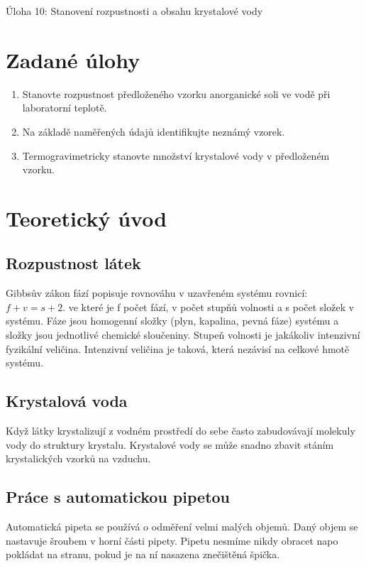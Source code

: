 \documentclass[13pt, a4paper, twoside]{article}
\begin{document}
\begin{center}
    \Huge
    Úloha 10: Stanovení rozpustnosti a obsahu krystalové vody
\end{center}
\large \onehalfspacing
\section*{Zadané úlohy}
\begin{enumerate}
    \item Stanovte rozpustnost předloženého vzorku anorganické soli ve vodě při laboratorní teplotě.
    \item Na základě naměřených údajů identifikujte neznámý vzorek.
    \item Termogravimetricky stanovte množství krystalové vody v předloženém vzorku.
\end{enumerate}

\section*{Teoretický úvod}
\subsection*{Rozpustnost látek}
Gibbsův zákon fází popisuje rovnováhu v uzavřeném systému rovnicí: $f+v = s +2 $.
ve které je f počet fází, v počet stupňů volnosti a s počet složek v systému. Fáze jsou homogenní složky (plyn, kapalina, pevná fáze) systému a složky jsou jednotlivé chemické sloučeniny. Stupeň volnosti je jakákoliv intenzivní fyzikální veličina. Intenzivní veličina je taková, která nezávisí na celkové hmotě systému.

\subsection*{Krystalová voda}
Když látky krystalizují z vodném prostředí do sebe často zabudovávají molekuly vody do struktury krystalu. Krystalové vody se může snadno zbavit stáním krystalických vzorků na vzduchu.

\subsection*{Práce s automatickou pipetou}
Automatická pipeta se používá o odměření velmi malých objemů. Daný objem se nastavuje šroubem v horní části pipety. Pipetu nesmíme nikdy obracet napo pokládat na stranu, pokud je na ní nasazena znečištěná špička.
\end{document}
